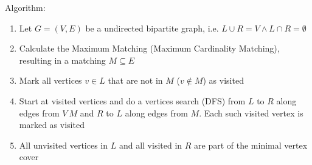 \documentclass[a4paper,titlepage]{article}
\begin{document}
Algorithm:
\begin{enumerate}
\item Let $G = (V, E)$ be a undirected bipartite graph, i.e. $L \cup R = V \land L \cap R = \emptyset$
\item Calculate the Maximum Matching (Maximum Cardinality Matching), resulting in a matching $M \subseteq E$
\item Mark all vertices $v \in L$ that are not in $M$ ($v \notin M$) as visited
\item Start at visited vertices and do a vertices search (DFS) from $L$ to $R$ along edges from $V \ M$ and $R$ to $L$ along edges from $M$. Each such visited vertex is marked as visited
\item All unvisited vertices in $L$ and all visited in $R$ are part of the minimal vertex cover
\end{enumerate}

\newpage
\printindex
\end{document}
